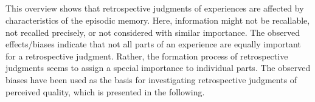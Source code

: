 \subparagraph*{}
This overview shows that retrospective judgments of experiences are affected by characteristics of the episodic memory.
Here, information might not be recallable, not recalled precisely, or not considered with similar importance.
The observed effects/biases indicate that not all parts of an experience are equally important for a retrospective judgment.
Rather, the formation process of retrospective judgments seems to assign a special importance to individual parts.
The observed biases have been used as the basis for investigating retrospective judgments of perceived quality, which is presented in the following.
